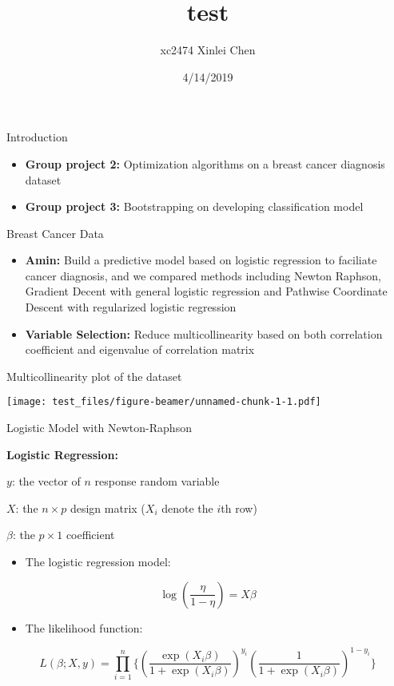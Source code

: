 \documentclass[ignorenonframetext,]{beamer}
\title{test}
\author{xc2474 Xinlei Chen}
\date{4/14/2019}
\providecommand{\tightlist}{%
  \setlength{\itemsep}{0pt}\setlength{\parskip}{0pt}}
\begin{document}
\frame{\titlepage}

\begin{frame}{Introduction}

\begin{itemize}
\item
  \textbf{Group project 2:} Optimization algorithms on a breast cancer
  diagnosis dataset
\item
  \textbf{Group project 3:} Bootstrapping on developing classification
  model
\end{itemize}

\end{frame}

\begin{frame}{Breast Cancer Data}

\begin{itemize}
\tightlist
\item
  \textbf{Amin: } Build a predictive model based on logistic regression
  to faciliate cancer diagnosis, and we compared methods including
  Newton Raphson, Gradient Decent with general logistic regression and
  Pathwise Coordinate Descent with regularized logistic regression
\item
  \textbf{Variable Selection:} Reduce multicollinearity based on both
  correlation coefficient and eigenvalue of correlation matrix
\end{itemize}

\end{frame}

\begin{frame}{}

Multicollinearity plot of the dataset

\texttt{[image: test\_files/figure-beamer/unnamed-chunk-1-1.pdf]}

\end{frame}

\begin{frame}{Logistic Model with Newton-Raphson}

\textbf{Logistic Regression:}

\(y\): the vector of \(n\) response random variable

\(X\): the \(n\times p\) design matrix (\(X_{i}\) denote the \(i\)th
row)

\(\beta\): the \(p\times 1\) coefficient

\begin{itemize}
\tightlist
\item
  The logistic regression model:
\end{itemize}

\[\log(\frac{\eta}{1-\eta}) = X\beta\]

\begin{itemize}
\tightlist
\item
  The likelihood function:
\end{itemize}

\[L(\beta; X, y) = \prod_{i=1}^n \{(\frac{\exp(X_{i}\beta)}{1+\exp(X_{i}\beta)})^{y_i}(\frac{1}{1+\exp(X_{i}\beta)})^{1-y_i}\}\]

\end{frame}
\end{document}
